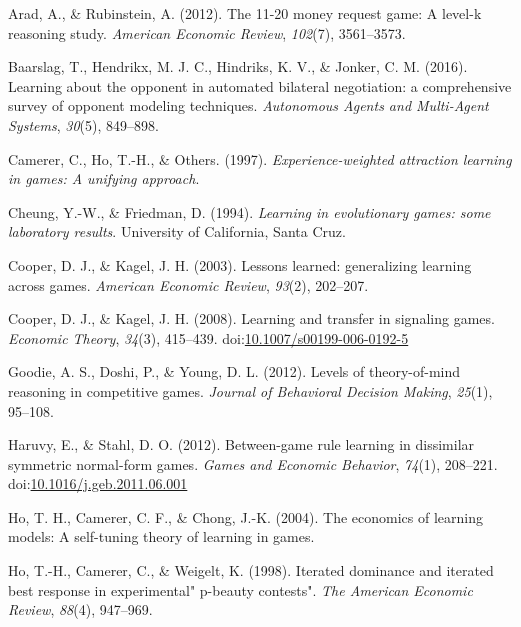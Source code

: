 \documentclass[man,floatsintext]{apa6}
\begin{document}
\begingroup
\setlength{\parindent}{-0.5in}
\setlength{\leftskip}{0.5in}

\hypertarget{refs}{}
\leavevmode\hypertarget{ref-arad201211}{}%
Arad, A., \& Rubinstein, A. (2012). The 11-20 money request game: A level-k reasoning study. \emph{American Economic Review}, \emph{102}(7), 3561--3573.

\leavevmode\hypertarget{ref-baarslag2016learning}{}%
Baarslag, T., Hendrikx, M. J. C., Hindriks, K. V., \& Jonker, C. M. (2016). Learning about the opponent in automated bilateral negotiation: a comprehensive survey of opponent modeling techniques. \emph{Autonomous Agents and Multi-Agent Systems}, \emph{30}(5), 849--898.

\leavevmode\hypertarget{ref-camerer1997experience}{}%
Camerer, C., Ho, T.-H., \& Others. (1997). \emph{Experience-weighted attraction learning in games: A unifying approach}.

\leavevmode\hypertarget{ref-cheung1994learning}{}%
Cheung, Y.-W., \& Friedman, D. (1994). \emph{Learning in evolutionary games: some laboratory results}. University of California, Santa Cruz.

\leavevmode\hypertarget{ref-cooper2003lessons}{}%
Cooper, D. J., \& Kagel, J. H. (2003). Lessons learned: generalizing learning across games. \emph{American Economic Review}, \emph{93}(2), 202--207.

\leavevmode\hypertarget{ref-Cooper2008}{}%
Cooper, D. J., \& Kagel, J. H. (2008). Learning and transfer in signaling games. \emph{Economic Theory}, \emph{34}(3), 415--439. doi:\href{https://doi.org/10.1007/s00199-006-0192-5}{10.1007/s00199-006-0192-5}

\leavevmode\hypertarget{ref-goodie2012levels}{}%
Goodie, A. S., Doshi, P., \& Young, D. L. (2012). Levels of theory-of-mind reasoning in competitive games. \emph{Journal of Behavioral Decision Making}, \emph{25}(1), 95--108.

\leavevmode\hypertarget{ref-Haruvy2012}{}%
Haruvy, E., \& Stahl, D. O. (2012). Between-game rule learning in dissimilar symmetric normal-form games. \emph{Games and Economic Behavior}, \emph{74}(1), 208--221. doi:\href{https://doi.org/10.1016/j.geb.2011.06.001}{10.1016/j.geb.2011.06.001}

\leavevmode\hypertarget{ref-ho2004economics}{}%
Ho, T. H., Camerer, C. F., \& Chong, J.-K. (2004). The economics of learning models: A self-tuning theory of learning in games.

\leavevmode\hypertarget{ref-ho1998iterated}{}%
Ho, T.-H., Camerer, C., \& Weigelt, K. (1998). Iterated dominance and iterated best response in experimental" p-beauty contests". \emph{The American Economic Review}, \emph{88}(4), 947--969.
\end{document}
